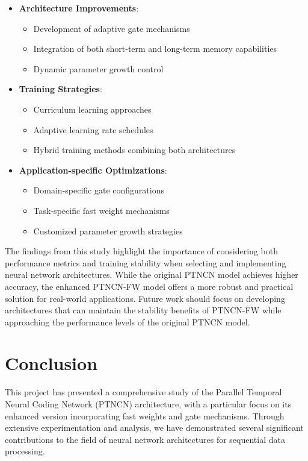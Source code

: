 \documentclass{article}
\begin{document}
\begin{itemize}
    \item \textbf{Architecture Improvements}:
    \begin{itemize}
        \item Development of adaptive gate mechanisms
        \item Integration of both short-term and long-term memory capabilities
        \item Dynamic parameter growth control
    \end{itemize}

    \item \textbf{Training Strategies}:
    \begin{itemize}
        \item Curriculum learning approaches
        \item Adaptive learning rate schedules
        \item Hybrid training methods combining both architectures
    \end{itemize}

    \item \textbf{Application-specific Optimizations}:
    \begin{itemize}
        \item Domain-specific gate configurations
        \item Task-specific fast weight mechanisms
        \item Customized parameter growth strategies
    \end{itemize}
\end{itemize}

The findings from this study highlight the importance of considering both performance metrics and training stability when selecting and implementing neural network architectures. While the original PTNCN model achieves higher accuracy, the enhanced PTNCN-FW model offers a more robust and practical solution for real-world applications. Future work should focus on developing architectures that can maintain the stability benefits of PTNCN-FW while approaching the performance levels of the original PTNCN model.

\section{Conclusion}

This project has presented a comprehensive study of the Parallel Temporal Neural Coding Network (PTNCN) architecture, with a particular focus on its enhanced version incorporating fast weights and gate mechanisms. Through extensive experimentation and analysis, we have demonstrated several significant contributions to the field of neural network architectures for sequential data processing.
\end{document}
